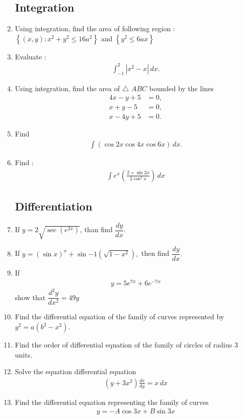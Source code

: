 \documentclass[12pt,-letter paper]{article}
\providecommand{\cbrak}[1]{\ensuremath{\left\{#1\right\}}}
\providecommand{\brak}[1]{\ensuremath{\left(#1\right)}}
\begin{document}
\begin{enumerate}
\subsection*{Integration}                                               
\item Using  integration, find the area of following region :$\cbrak{\brak{x,y}:x^2+y^2\leq16a^2}$ and $\cbrak{y^2\leq6ax}$
\item Evaluate :
\begin{align*}
\int_{-1}^{2}|x^2-x|\, dx.
\end{align*}  
\item Using integration, find the area of $\triangle$ $ABC$ bounded by the lines
\begin{align*}
4x-y+5&=0,\\x+y-5&=0,\\x-4y+5&=0.
\end{align*}                                              
\item Find
\begin{align*}
\int\brak{\cos2x\cos4x\cos6x} \, dx. 
\end{align*}         
\item Find :
\begin{align*}
\int{e^x\left(\frac{2+\sin 2x}{2\cos^2 x}\right) \, dx}
\end{align*}
\subsection*{Differentiation}
\item If $y=2\sqrt{\sec\brak{e^{2x}}}$, than find $\dfrac{dy}{dx}$.
\item If $ y=\brak{\sin x}^x+\sin{-1}\brak{\sqrt{1-x^2}},$ then find $\dfrac{dy}{dx}.$   
\item If \begin{align*}y= 5e^{7x}+6e^{-7x}\end{align*}  show that $\dfrac{d^2y}{dx^2}=49y$
\item Find the differential equation of the family of curves represented by $y^2=a\brak{b^2-x^2}$.
\item Find the order of differential equation of the family of circles of radius $3$ units.
\item Solve the equation differential equation \begin{align*}\brak{y+3x^2}\frac{dx}{dy}=x\, dx \end{align*}
\item Find the differential equation representing the family of curves \begin{align*}y= -A\cos 3x+B\sin 3x\end{align*}

\end{enumerate}
\end{document}

